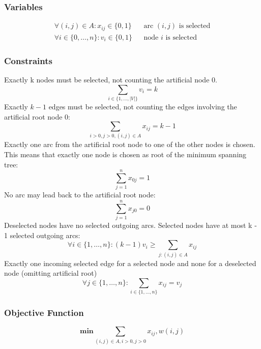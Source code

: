 \documentclass{article}
\begin{document}
\subsubsection{Variables}
\begin{eqnarray}
\forall(i,j)\in A: x_{ij} \in \{0,1\}  && \text{arc $(i,j)$ is selected} \\
\forall i \in \{0,\ldots,n\}: v_i \in \{0, 1\} && \text{node $i$ is selected} 
\end{eqnarray}
\subsubsection{Constraints}
Exactly k nodes must be selected, not counting the artificial node 0.
\begin{equation}
\sum_{i\in\{1,\ldots,|V|\}} v_i = k
\end{equation}
Exactly $k-1$ edges must be selected, not counting the edges involving the artificial root node 0:
\begin{equation}
\sum_{i>0, j>0, (i,j)\in A} x_{ij} = k - 1 
\end{equation}
Exactly one arc from the artificial root node to one of the other nodes is chosen. This means that exactly one node is chosen as root of the minimum spanning tree:
\begin{equation}
\sum_{j=1}^{n} x_{0j} = 1
\end{equation}
No arc may lead back to the artificial root node:
\begin{equation}
\sum_{j=1}^{n} x_{j0} = 0
\end{equation}
Deselected nodes have no selected outgoing arcs. Selected nodes have at most k - 1 selected outgoing arcs:
\begin{equation}
\forall i \in \{1,\ldots,n\}: (k-1)v_i \geq \sum_{j:(i,j)\in A} x_{ij}
\end{equation}
Exactly one incoming selected edge for a selected node and none for a deselected node (omitting artificial root)
\begin{equation}
\forall j\in\{1,\ldots,n\}: \sum_{i\in\{1,\ldots,n\}} x_{ij} = v_j
\end{equation}

\subsubsection{Objective Function}
\begin{equation}
\textbf{min} \sum_{(i, j) \in A, i>0, j>0} x_{ij},w(i,j) 
\end{equation}
\end{document}
